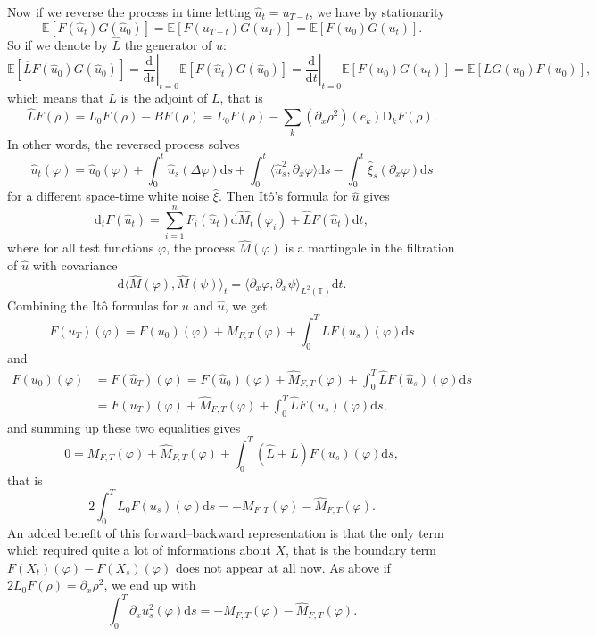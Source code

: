 \documentclass[a4paper,11pt]{article}
\newcommand{\mathD}{\mathrm{D}}
\newcommand{\mathd}{\mathrm{d}}
\begin{document}
Now if we reverse the process in time letting $\hat{u}_t = u_{T - t}$, we have
by stationarity
\[ \mathbb{E} [F (\hat{u}_t) G (\hat{u}_0)] =\mathbb{E} [F (u_{T - t}) G
   (u_T)] =\mathbb{E} [F (u_0) G (u_t)] . \]
So if we denote by $\hat{L}$ the generator of $\hat{u}$:
\[ \mathbb{E} [\hat{L} F (\hat{u}_0) G (\hat{u}_0)] = \left.
   \frac{\mathd}{\mathd t} \right|_{t = 0} \mathbb{E} [F (\hat{u}_t) G
   (\hat{u}_0)] = \left. \frac{\mathd}{\mathd t} \right|_{t = 0} \mathbb{E}
   [F (u_0) G (u_t)] =\mathbb{E} [L G (u_0) F (u_0)], \]
which means that $\hat{L}$ is the adjoint of $L$, that is
\[ \hat{L} F (\rho) = L_0 F (\rho) - B F (\rho) = L_0 F (\rho) - \sum_k
   (\partial_x \rho^2) (e_k) \mathD_k F (\rho) . \]
   In other words, the reversed process solves
\[ \hat u_t (\varphi) = \hat u_0 (\varphi) + \int_0^t \hat u_s (\Delta \varphi) \mathd s +
   \int_0^t \langle \hat u^2_s, \partial_x \varphi \rangle \mathd s - \int_0^t
   \hat \xi_s (\partial_x \varphi) \mathd s \]
   for a different space-time white noise $\hat \xi$. Then It{\^o}'s formula for $\hat u$ gives
\[ \mathd_t F (\hat{u}_t) = \sum_{i = 1}^n F_i (\hat{u}_t) \mathd \hat{M}_t
   (\varphi_i) + \hat{L} F (\hat{u}_t) \mathd t, \]
where for all test functions $\varphi$, the process $\hat{M} (\varphi)$ is a
martingale in the filtration of $\hat{u}$ with covariance
\[ \mathd \langle \hat{M} (\varphi), \hat{M} (\psi) \rangle_t = \langle
   \partial_x \varphi, \partial_x \psi \rangle_{L^2 (\mathbb{T})} \mathd t.
\]
Combining the It{\^o} formulas for $u$ and $\hat{u}$, we get
\[ F (u_T) (\varphi) = F (u_0) (\varphi) + M_{F, T} (\varphi) + \int_0^T L F
   (u_s) (\varphi) \mathd s \]
and
\begin{align*}
   F (u_0) (\varphi) & = F (\hat{u}_T) (\varphi) = F (\hat{u}_0) (\varphi) +  \hat{M}_{F, T} (\varphi) + \int_0^T \hat{L} F (\hat{u}_s) (\varphi) \mathd s \\
   & = F (u_T) (\varphi) + \hat{M}_{F, T} (\varphi) + \int_0^T \hat{L} F (u_s) (\varphi) \mathd s,
\end{align*}
and summing up these two equalities gives
\[ 0 = M_{F, T} (\varphi) + \hat{M}_{F, T} (\varphi) + \int_0^T (\hat{L} + L)
   F (u_s) (\varphi) \mathd s, \]
that is
\[ 2 \int_0^T L_0 F (u_s) (\varphi) \mathd s = - M_{F, T} (\varphi) -
   \hat{M}_{F, T} (\varphi) . \]
An added benefit of this forward--backward representation is that the only term
which required quite a lot of informations about $X$, that is the boundary
term $F (X_t) (\varphi) - F (X_s) (\varphi)$ does not appear at all now. As
above if $2 L_0 F (\rho) = \partial_x \rho^2$, we end up with
\begin{equation}
  \label{eq:martingale trick sbe}  \int_0^T \partial_x u_s^2 (\varphi) \mathd
  s = - M_{F, T} (\varphi) - \hat{M}_{F, T} (\varphi) .
\end{equation}
\
\end{document}
